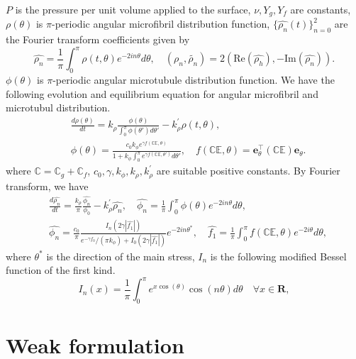 \documentclass[11pt]{amsart}
\numberwithin{figure}{section}
\theoremstyle{plain}
\theoremstyle{definition}
\numberwithin{equation}{section}
\begin{document}
$P$ is the pressure per unit volume applied to the surface, $\nu,Y_{g} , Y_{f} $ are constants,
$\rho(\theta)$ is $\pi$-periodic angular microfibril distribution function, $\{\widehat{\rho_{n}}(t)\}_{n=0}^{2}  $ are the Fourier transform coefficients given by
\[
\widehat{\rho_{n}}  = \frac{1}{ \pi } \int_{0} ^{\pi} \rho(t, \theta) e^{-2in\theta} d\theta, \quad 
\left(\rho_{n} , \widetilde{\rho_{n} }\right) = 2 \left( \text{Re} \left(\widehat{\rho_{h} }\right), - \text{Im} \left( \widehat{\rho_{n} }\right)\right).
\] 
$\phi(\theta) $ is $\pi$-periodic angular microtubule distribution function.
We have the following evolution and equilibrium equation for angular microfibril and microtubul distribution.
\begin{align}
&  \frac{d \rho (\theta)}{d t}   = k_\rho \frac{\phi(\theta)}{\int_0^\pi \phi(\theta') d \theta'}  - k_\rho^{'}\rho(t, \theta),\\
&  \phi(\theta)   = \frac{c_0 k_\phi e^{\gamma f(\mathbb{C} \mathbb{E}, \theta)}}{1 + k_\phi \int_0^\pi e^{ \gamma f(\mathbb{C}\mathbb{E},\theta')} d \theta'}, 
\quad  f(\mathbb{C}  \mathbb{E}, \theta)  = \bm{e}_\theta^{\top}   \left (\mathbb{C}  \mathbb{E} \right)  \bm{e}_\theta.
\end{align}
where $\mathbb{C} = \mathbb{C}_{g} + \mathbb{C}_{f} $, $c_0, \gamma, k_\phi, k_\rho, k_\rho^{'}$ are suitable positive constants.
By Fourier transform, we have 
\begin{align}
& \frac{ d \widehat{\rho_{n}} }{ d t }  = \frac{ k_{\rho}  }{ \pi } \frac{ \widehat{\phi_{n} } }{ {\phi_{0} } } - k_{\rho} ^{'} \widehat{\rho_{n} },  \quad 
\widehat{\phi_{n}} = \frac{1}{ \pi } \int_{0} ^{\pi} \phi(\theta) e^{-2in\theta} d\theta, \\
& \widehat{\phi_{n}}  = \frac{ c_0 }{ \pi } \frac{ I_{n} \left(2 \gamma \left|\widehat{f_1}\right|\right) }{ { e^{-\gamma f_0} }/( \pi k_{\phi}  ) + I_0 \left( 2 \gamma \left| \widehat{f_1} \right|\right)  } e^{-2in\theta^*}, \quad 
\widehat{f_1} = \frac{ 1 }{ \pi } \int_{0} ^{\pi} f(\mathbb{C}\mathbb{E},\theta) e^{-2i\theta} d \theta,
\end{align}
where $\theta^* $ is the direction of the main stress, $I_{n}$ is the following modified Bessel function of the first kind.
\[
I_{n} (x)  = \frac{ 1 }{ \pi } \int_{0} ^\pi e^{x \cos(\theta)} \cos ( n \theta )d \theta \quad \forall x \in \mathbf{R},
\] 

\newpage 

\section{Weak formulation}
\end{document}

